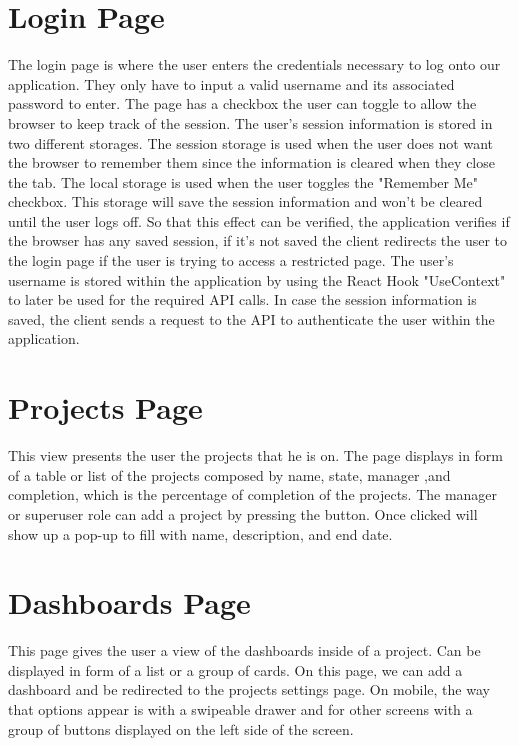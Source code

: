 \documentclass[a4paper,twoside,10pt]{report}
\begin{document}
\section{Login Page}
The login page is where the user enters the credentials necessary to log onto our application.
They only have to input a valid username and its associated password to enter.
\newline
The page has a checkbox the user can toggle to allow the browser to keep track of the session. 
The user's session information is stored in two different storages.
\newline
The session storage is used when the user does not want the browser to remember them since the information is cleared when they close the tab.
\newline
The local storage is used when the user toggles the "Remember Me" checkbox. This storage will save the session information and won't be cleared until the user logs off.
So that this effect can be verified, the application verifies if the browser has any saved session, if it's not saved the client redirects the user to the login page if the user is trying to access a restricted page.
\newline
The user's username is stored within the application by using the React Hook "UseContext" to later be used for the required API calls.
In case the session information is saved, the client sends a request to the API to authenticate the user within the application.
\newline

\section{Projects Page}
This view presents the user the projects that he is on. The page displays in form of a table or list of the projects composed by name, state, manager ,and completion, which is the percentage of completion of the projects. The manager or superuser role can add a project by pressing the button. Once clicked will show up a pop-up to fill with name, description, and end date.

\section{Dashboards Page}
This page gives the user a view of the dashboards inside of a project. Can be displayed in form of a list or a group of cards. On this page, we can add a dashboard and be redirected to the projects settings page. On mobile, the way that options appear is with a swipeable drawer and for other screens with a group of buttons displayed on the left side of the screen.
\end{document}
